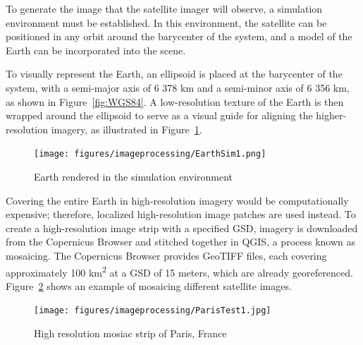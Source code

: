 

\noindent
To generate the image that the satellite imager will observe, a simulation environment must be established. In this environment, the satellite can 
be positioned in any orbit around the barycenter of the system, and a model of the Earth can be incorporated into the scene.
\vspace{0.5cm}

\noindent
To visually represent the Earth, an ellipsoid is placed at the barycenter of the system, with a semi-major axis of 6 378 km and a semi-minor axis of 6 356 km, 
as shown in Figure~\ref{fig:WGS84}. A low-resolution texture of the Earth is then wrapped around the ellipsoid to serve as a visual guide for aligning the 
higher-resolution imagery, as illustrated in Figure~\ref{fig:EarthSim}.
\vspace{0.5cm}

\begin{figure}[H]
\centering
\texttt{[image: figures/imageprocessing/EarthSim1.png]}
\caption{Earth rendered in the simulation environment}
\label{fig:EarthSim}
\end{figure}

\noindent
Covering the entire Earth in high-resolution imagery would be computationally expensive; therefore, localized high-resolution 
image patches are used instead. To create a high-resolution image strip with a specified GSD, imagery is downloaded from the Copernicus 
Browser and stitched together in QGIS, a process known as mosaicing. The Copernicus Browser provides GeoTIFF files, each covering 
approximately 100 km\textsuperscript{2} at a GSD of 15 meters, which are already georeferenced. Figure~\ref{fig:Paris} shows an example of mosaicing different satellite images.

\begin{figure}[H]
    \centering
    \texttt{[image: figures/imageprocessing/ParisTest1.jpg]}
    \caption{High resolution mosiac strip of Paris, France}
    \label{fig:Paris}
\end{figure}

